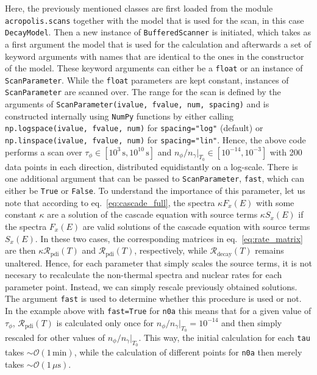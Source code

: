 \documentclass[11pt,a4paper]{article}
\begin{document}
Here, the previously mentioned classes are first loaded from the module \texttt{acropolis.scans} together with the model that is used for the scan, in this case \texttt{DecayModel}. Then a new instance of \texttt{BufferedScanner} is initiated, which takes as a first argument the model that is used for the calculation and afterwards a set of keyword arguments with names that are identical to the ones in the constructor of the model. These keyword arguments can either be a \texttt{float} or an instance of \texttt{ScanParameter}. While the \texttt{float} parameters are kept constant, instances of \texttt{ScanParameter} are scanned over. The range for the scan is defined by the arguments of \texttt{ScanParameter(ivalue, fvalue, num, spacing)} and is constructed internally using \texttt{NumPy} functions by either calling \texttt{np.logspace(ivalue, fvalue, num)} for \texttt{spacing="log"} (default) or \texttt{np.linspace(ivalue, fvalue, num)} for \texttt{spacing="lin"}. Hence, the above code performs a scan over $\tau_\phi \in [10^3\,\mathrm{s}, 10^{10}\,\mathrm{s}]$ and $n_\phi/n_\gamma|_{T_0} \in [10^{-14}, 10^{-3}]$ with 200 data points in each direction, distributed equidistantly on a log-scale. There is one additional argument that can be passed to \texttt{ScanParameter},  \texttt{fast}, which can either be \texttt{True} or \texttt{False}. To understand the importance of this parameter, let us note that according to eq.~\eqref{eq:cascade_full}, the spectra $\kappa F_x(E)$ with some constant $\kappa$ are a solution of the cascade equation with source terms $\kappa S_x(E)$ if the spectra $F_x(E)$ are valid solutions of the cascade equation with source terms $S_x(E)$. In these two cases, the corresponding matrices in eq.~\eqref{eq:rate_matrix} are then $\kappa \mathcal{R}_\text{pdi}(T)$ and $\mathcal{R}_\text{pdi}(T)$, respectively, while $\mathcal{R}_\text{decay}(T)$ remains unaltered. Hence, for each parameter that simply scales the source terms, it is not necesary to recalculate the non-thermal spectra and nuclear rates for each parameter point. Instead, we can simply rescale previously obtained solutions.
The argument \texttt{fast} is used to determine whether this procedure is used or not. In the example above with \texttt{fast=True} for \texttt{n0a} this means that for a given value of $\tau_\phi$, $\mathcal{R}_\text{pdi}(T)$ is calculated only once for $n_\phi/n_\gamma|_{T_0} = 10^{-14}$ and then simply rescaled for other values of $n_\phi/n_\gamma|_{T_0}$. This way, the initial calculation for each \texttt{tau} takes $\sim \mathcal{O}(1\,\mathrm{min})$, while the calculation of different points for \texttt{n0a} then merely takes $\sim \mathcal{O}(1\,\mu\mathrm{s})$.
\end{document}
